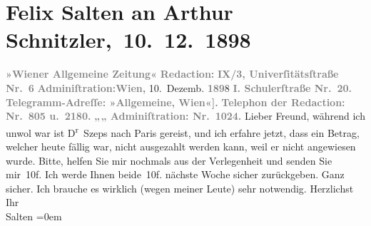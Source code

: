 

         
         \renewcommand{\erwaehntePersonen}{Personen: Felix Salten, Julius Szeps}
         \renewcommand{\erwaehnteInstitutionen}{Institutionen: Wiener Allgemeine Zeitung}
         \renewcommand{\erwaehnteOrte}{Orte: Paris, Schulerstraße, Universitätsstraße, Wien}
         \renewcommand{\erwaehnteWerke}{}
               \section[ Felix Salten an Arthur Schnitzler, 10. 12. 1898]{ Felix Salten an Arthur Schnitzler, 10. 12. 1898}\nopagebreak{}\rehead{ }\begin{ledgroupsized}[t]{13cm}\normalsize\beginnumbering \toendnotes[C]{\smallbreak\pagebreak[2]} 
\pstart
           \noindent{}{\pb}\textcolor{gray}{\textbf{\textbf{»Wiener Allgemeine
                        Zeitung«}}}\pend
           \pstart
           \textcolor{gray}{\textbf{Redaction:}}\pend
           \pstart
           \textcolor{gray}{\textbf{\textbf{IX/3, Univerſitätsſtraße Nr. 6}}}\pend
           \pstart
           \textcolor{gray}{\textbf{Adminiſtration:}}\hfill \textcolor{gray}{\textbf{Wien,}}{ }10. Dezemb. \textcolor{gray}{\textbf{189}}8\pend
           \pstart
           \textcolor{gray}{\textbf{\textbf{I. Schulerſtraße Nr. 20.}}}\pend
           \pstart
           \textcolor{gray}{\textbf{Telegramm-Adreſſe: »Allgemeine, Wien\oindex{Wien@\textbf{Wien}|pw}{[}«{]}.}}\pend
           \pstart
           \textcolor{gray}{\textbf{Telephon der Redaction: Nr. 805 u. 2180.}}\pend
           \pstart
           \textcolor{gray}{\textbf{\hspace*{1.5em}„\hspace*{1.5em}„\hspace*{1.5em} Adminiſtration: Nr. 1024.}}\pend
           \pstart{}Lieber Freund,\pend\pstart
           während ich unwol war ist D\textsuperscript{r} Szeps nach Paris gereist,
               und ich erfahre jetzt, dass ein Betrag, welcher heute
               fällig war, nicht ausgezahlt werden kann, weil er nicht angewiesen wurde. Bitte,
               helfen Sie mir nochmals aus der Verlegenheit und senden Sie mir 10f. Ich werde Ihnen
               beide 10f. nächste Woche sicher zurückgeben. Ganz sicher. Ich brauche es wirklich
               (wegen meiner Leute) sehr notwendig.\pend
           \pstart
           Herzlichst Ihr {\\[\baselineskip]}\spacefill\mbox{Salten}\pend
           \leftskip=0em{}
         

\end{ledgroupsized}
